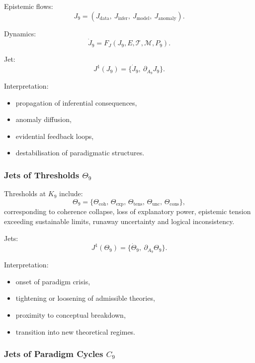 Epistemic flows:
\[
J_9=
(J_{\mathrm{data}},\ 
 J_{\mathrm{infer}},\ 
 J_{\mathrm{model}},\ 
 J_{\mathrm{anomaly}}).
\]

Dynamics:
\[
\dot{J}_9 = 
F_J(J_9,E,\mathcal{T},\mathcal{M},P_9).
\]

Jet:
\[
J^1(J_9)=\{\dot{J}_9,\ \partial_{A_9}J_9\}.
\]

Interpretation:
\begin{itemize}
    \item propagation of inferential consequences,
    \item anomaly diffusion,
    \item evidential feedback loops,
    \item destabilisation of paradigmatic structures.
\end{itemize}


\subsubsection{Jets of Thresholds \texorpdfstring{$\Theta_9$}{\Theta_9}}

Thresholds at $K_9$ include:
\[
\Theta_9 =
\{
\Theta_{\mathrm{coh}},\,
\Theta_{\mathrm{exp}},\,
\Theta_{\mathrm{tens}},\,
\Theta_{\mathrm{unc}},\,
\Theta_{\mathrm{cons}}
\},
\]
corresponding to coherence collapse, loss of explanatory power,
epistemic tension exceeding sustainable limits, runaway uncertainty and
logical inconsistency.

Jets:
\[
J^1(\Theta_9)=\{\dot{\Theta}_9,\ \partial_{A_9}\Theta_9\}.
\]

Interpretation:
\begin{itemize}
    \item onset of paradigm crisis,
    \item tightening or loosening of admissible theories,
    \item proximity to conceptual breakdown,
    \item transition into new theoretical regimes.
\end{itemize}


\subsubsection{Jets of Paradigm Cycles \texorpdfstring{$C_9$}{C_9}}

